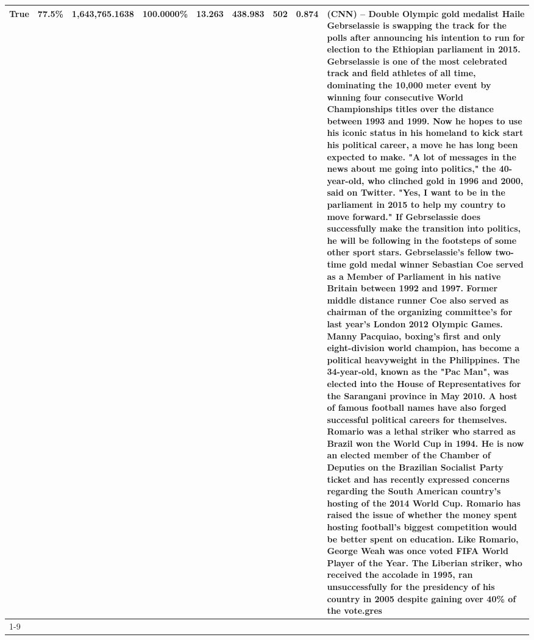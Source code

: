 \begin{table}[H]
{\begin{tabular}{lllrlllll}
True & 77.5\% & 1,643,765.1638 & \bfseries \color{red} 100.0000\% & 13.263 & 438.983 & 502 & 0.874 & (CNN) -- Double Olympic gold medalist Haile Gebrselassie is swapping the track for the polls after announcing his intention to run for election to the Ethiopian parliament in 2015. Gebrselassie is one of the most celebrated track and field athletes of all time, dominating the 10,000 meter event by winning four consecutive World Championships titles over the distance between 1993 and 1999. Now he hopes to use his iconic status in his homeland to kick start his political career, a move he has long been expected to make. "A lot of messages in the news about me going into politics," the 40-year-old, who clinched gold in 1996 and 2000, said on Twitter. "Yes, I want to be in the parliament in 2015 to help my country to move forward." If Gebrselassie does successfully make the transition into politics, he will be following in the footsteps of some other sport stars. Gebrselassie's fellow two-time gold medal winner Sebastian Coe served as a Member of Parliament in his native Britain between 1992 and 1997. Former middle distance runner Coe also served as chairman of the organizing committee's for last year's London 2012 Olympic Games. Manny Pacquiao, boxing's first and only eight-division world champion, has become a political heavyweight in the Philippines. The 34-year-old, known as the "Pac Man", was elected into the House of Representatives for the Sarangani province in May 2010. A host of famous football names have also forged successful political careers for themselves. Romario was a lethal striker who starred as Brazil won the World Cup in 1994. He is now an elected member of the Chamber of Deputies on the Brazilian Socialist Party ticket and has recently expressed concerns regarding the South American country's hosting of the 2014 World Cup. Romario has raised the issue of whether the money spent hosting football's biggest competition would be better spent on education. Like Romario, George Weah was once voted FIFA World Player of the Year. The Liberian striker, who received the accolade in 1995, ran unsuccessfully for the presidency of his country in 2005 despite gaining over 40\% of the vote.gres \\
\cline{1-9}

\end{tabular}}
\end{table}
